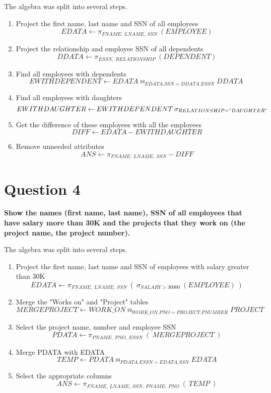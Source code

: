 \documentclass{article}
\begin{document}
    The algebra was split into several steps.
    
    \begin{enumerate}
        \item Project the first name, last name and SSN of all employees
        \[ EDATA \gets \pi _{FNAME, \: LNAME, \: SSN} \: (EMPLOYEE)\]
        \item Project the relationship and employee SSN of all dependents
        \[ DDATA \gets \pi _{ESSN, \: RELATIONSHIP} \: (DEPENDENT) \]
        \item Find all employees with dependents
        \[ EWITHDEPENDENT \gets EDATA \bowtie _{EDATA.SSN = DDATA.ESSN} DDATA \:  \]
        \item Find all employees with daughters
        \[ EWITHDAUGHTER \gets EWITHDEPENDENT\: \sigma _{RELATIONSHIP="DAUGHTER"}\:  \]
        \item Get the difference of these employees with all the employees
        \[ DIFF \gets EDATA - EWITHDAUGHTER \]
        \item Remove unneeded attributes
        \[ ANS \gets \pi _{FNAME, \: LNAME,\: SSN} - DIFF \]
    \end{enumerate}

\section{Question 4}

    \textbf{Show the names (first name, last name), SSN of all employees that have salary more than 30K and the projects that they work on (the project name, the project number).}

    The algebra was split into several steps.
    
    \begin{enumerate}
        \item Project the first name, last name and SSN of employees with salary greater than 30K
        \[ EDATA \gets \pi _{FNAME, \: LNAME, \: SSN} \: ( \: \sigma _{SALARY > 30000} \: (EMPLOYEE) \: ) \]
        \item Merge the "Works on" and "Project" tables
        \[ MERGEPROJECT \gets WORK\_ON \bowtie _{WORK\_ON.PNO = PROJECT.PNUMBER} PROJECT \]
        \item Select the project name, number and employee SSN 
        \[ PDATA \gets \pi _{PNAME, \: PNO, \: ESSN} \: ( \:MERGEPROJECT \:) \]
        \item Merge PDATA with EDATA
        \[ TEMP \gets PDATA \bowtie _{PDATA.ESSN = EDATA.SSN} EDATA \]
        \item Select the appropriate columns
        \[ ANS \gets \pi _{FNAME, \: LNAME, \: SSN, \: PNAME, \: PNO} \: ( \: TEMP \: ) \]
    \end{enumerate}
\end{document}
